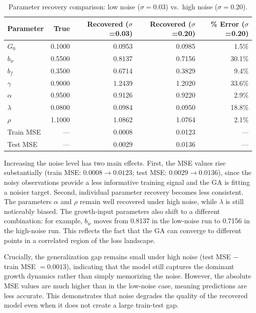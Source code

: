 \documentclass{article}
\begin{document}
\begin{enumerate}
\begin{answer}
\begin{table}[H]
\centering
\caption{Parameter recovery comparison: low noise ($\sigma=0.03$) vs.\ high noise ($\sigma=0.20$).}
\begin{tabular}{lrrrr}
\hline
\textbf{Parameter} & \textbf{True} & \textbf{Recovered ($\sigma$=0.03)} & \textbf{Recovered ($\sigma$=0.20)} & \textbf{\% Error ($\sigma$=0.20)} \\
\hline
$G_0$      & 0.1000 & 0.0953 & 0.0985 &  1.5\% \\
$b_w$      & 0.5500 & 0.8137 & 0.7156 & 30.1\% \\
$b_f$      & 0.3500 & 0.6714 & 0.3829 &  9.4\% \\
$\gamma$   & 0.9000 & 1.2439 & 1.2020 & 33.6\% \\
$\alpha$   & 0.9500 & 0.9126 & 0.9220 &  2.9\% \\
$\lambda$  & 0.0800 & 0.0984 & 0.0950 & 18.8\% \\
$\rho$     & 1.1000 & 1.0862 & 1.0764 &  2.1\% \\
\hline
Train MSE & --- & 0.0008 & 0.0123 & --- \\
Test MSE  & --- & 0.0029 & 0.0136 & --- \\
\hline
\end{tabular}
\label{tab:recovery_noise}
\end{table}

Increasing the noise level has two main effects. First, the MSE values rise substantially (train MSE: $0.0008 \to 0.0123$; test MSE: $0.0029 \to 0.0136$), since the noisy observations provide a less informative training signal and the GA is fitting a noisier target. Second, individual parameter recovery becomes less consistent. The parameters $\alpha$ and $\rho$ remain well recovered under high noise, while $\lambda$ is still noticeably biased. The growth-input parameters also shift to a different combination: for example, $b_w$ moves from 0.8137 in the low-noise run to 0.7156 in the high-noise run. This reflects the fact that the GA can converge to different points in a correlated region of the loss landscape.

Crucially, the generalization gap remains small under high noise (test MSE $-$ train MSE $= 0.0013$), indicating that the model still captures the dominant growth dynamics rather than simply memorizing the noise. However, the absolute MSE values are much higher than in the low-noise case, meaning predictions are less accurate. This demonstrates that noise degrades the quality of the recovered model even when it does not create a large train-test gap.
\end{answer}

\end{enumerate}
\end{document}
